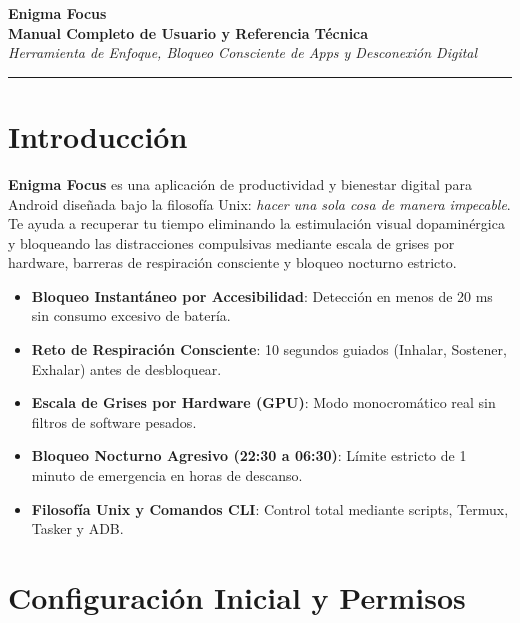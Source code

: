 \documentclass[11pt,a4paper]{article}
\begin{document}
\begin{center}
    {\Huge \textbf{\color{primaryDark}Enigma Focus}}\\[0.3cm]
    {\Large \textbf{\color{accentGreen}Manual Completo de Usuario y Referencia Técnica}}\\[0.2cm]
    \textit{Herramienta de Enfoque, Bloqueo Consciente de Apps y Desconexión Digital}\\[0.4cm]
    \rule{\linewidth}{1.5pt}
\end{center}

\vspace{0.3cm}

\section{Introducción}
\textbf{Enigma Focus} es una aplicación de productividad y bienestar digital para Android diseñada bajo la filosofía Unix: \textit{hacer una sola cosa de manera impecable}. Te ayuda a recuperar tu tiempo eliminando la estimulación visual dopaminérgica y bloqueando las distracciones compulsivas mediante escala de grises por hardware, barreras de respiración consciente y bloqueo nocturno estricto.

\begin{tcolorbox}[colback=codeBg,colframe=accentGreen,title=\textbf{Características Principales}]
\begin{itemize}[noitemsep]
    \item \textbf{Bloqueo Instantáneo por Accesibilidad}: Detección en menos de 20 ms sin consumo excesivo de batería.
    \item \textbf{Reto de Respiración Consciente}: 10 segundos guiados (Inhalar, Sostener, Exhalar) antes de desbloquear.
    \item \textbf{Escala de Grises por Hardware (GPU)}: Modo monocromático real sin filtros de software pesados.
    \item \textbf{Bloqueo Nocturno Agresivo (22:30 a 06:30)}: Límite estricto de 1 minuto de emergencia en horas de descanso.
    \item \textbf{Filosofía Unix y Comandos CLI}: Control total mediante scripts, Termux, Tasker y ADB.
\end{itemize}
\end{tcolorbox}

\section{Configuración Inicial y Permisos}
\end{document}
